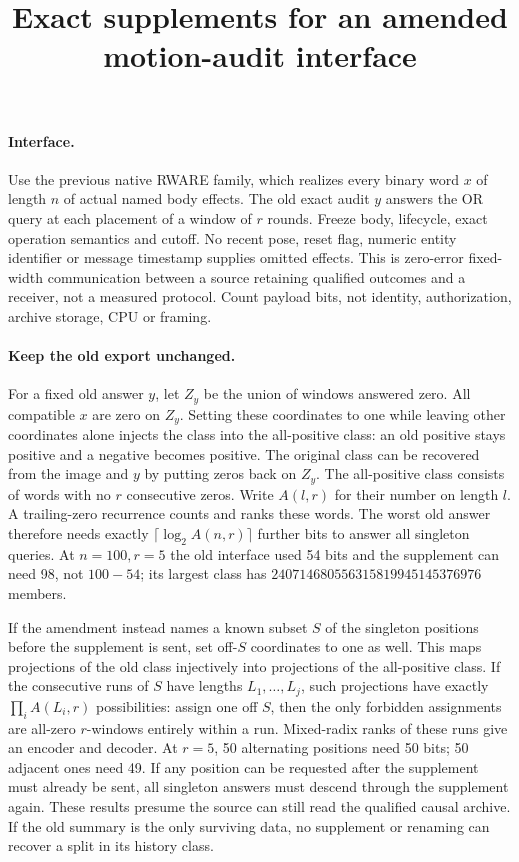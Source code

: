 \documentclass{article}
\begin{document}
\title{Exact supplements for an amended motion-audit interface}
\maketitle

\paragraph{Interface.}
Use the previous native RWARE family, which realizes every binary word $x$
of length $n$ of actual named body effects. The old exact audit $y$ answers
the OR query at each placement of a window of $r$ rounds.
Freeze body, lifecycle, exact operation semantics and cutoff. No recent
pose, reset flag, numeric entity identifier or message timestamp supplies
omitted effects. This is zero-error fixed-width communication between a
source retaining qualified outcomes and a receiver, not a measured
protocol. Count payload bits, not identity, authorization, archive storage,
CPU or framing.

\paragraph{Keep the old export unchanged.}
For a fixed old answer $y$, let $Z_y$ be the union of windows answered
zero. All compatible $x$ are zero on $Z_y$. Setting these coordinates
to one while leaving other coordinates alone injects the class into the
all-positive class: an old positive stays positive and a negative
becomes positive. The original class can be recovered from the image
and $y$ by putting zeros back on $Z_y$. The all-positive class consists
of words with no $r$ consecutive zeros. Write $A(l,r)$ for their number
on length $l$. A trailing-zero recurrence counts and ranks these words.
The worst old answer therefore needs exactly
$\lceil\log_2 A(n,r)\rceil$ further bits to answer all singleton queries.
At $n=100,r=5$ the old interface used 54 bits and the supplement can need
98, not $100-54$; its largest class has
$240714680556315819945145376976$ members.

If the amendment instead names a known subset $S$ of the singleton
positions before the supplement is sent, set off-$S$ coordinates to
one as well. This maps projections of the old class injectively into
projections of the all-positive class. If the consecutive runs of $S$
have lengths $L_1,\ldots,L_j$, such projections have exactly
$\prod_i A(L_i,r)$ possibilities: assign one off $S$, then the only
forbidden assignments are all-zero $r$-windows entirely within a run.
Mixed-radix ranks of these runs give an encoder and decoder.
At $r=5$, 50 alternating positions need 50 bits; 50 adjacent ones need
49. If any position can be requested after the supplement must already
be sent, all singleton answers must descend through the supplement again.
These results presume the source can still read the qualified causal
archive. If the old summary is the only surviving data, no supplement
or renaming can recover a split in its history class.
\end{document}
